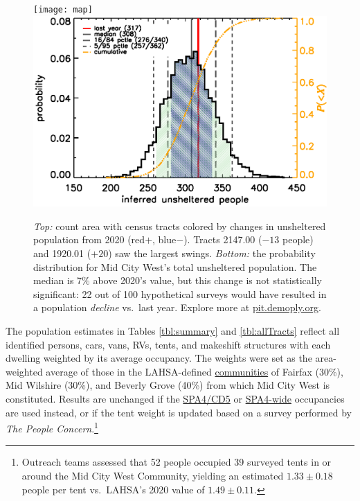 \documentclass[11pt]{article}
\begin{document}
\begin{figure}
	\centering
	\texttt{[image: map]}
	\includegraphics[width=\linewidth, trim = 0cm 0cm 0cm 0cm]{hper2021Hist}
	\caption{{\it Top:} count area with census tracts colored by  
			changes in unsheltered population from 2020 (red$+$, blue$-$).
			Tracts 2147.00 ($-13$ people) and 1920.01 ($+20$) saw the largest swings. 
			{\it Bottom:} the probability distribution for Mid City West's total unsheltered 
			population. The median is 7\% above 2020's value, but this change is not 
			statistically significant: 22 out of 100 hypothetical surveys
			would have resulted in a population {\it decline} vs.~last year.
			Explore more at \href{https://pit.demoply.org}{pit.demoply.org}.}
	\label{fig:tcomp}
\end{figure} 

 The population estimates in Tables \ref{tbl:summary} and \ref{tbl:allTracts} 
reflect all identified persons, cars, vans, RVs, tents, and makeshift structures with each
dwelling weighted by its average occupancy. The weights were set as the area-weighted 
average of those in the LAHSA-defined 
\href{https://www.lahsa.org/documents?id=4686-2020-greater-los-angeles-city-community-homelessness-report-service-planning-area-4.pdf}{communities} of Fairfax (30\%), Mid Wilshire (30\%), and 
Beverly Grove (40\%) from which Mid City West is constituted. Results are unchanged if 
the \href{https://www.lahsa.org/documents?id=4635-usc-2018-2020-multipliers-and-estimates-overview}
{SPA4/CD5} or \href{https://www.lahsa.org/documents?id=4693-2020-greater-los-angeles-homeless-count-cvrtm-conversion-factors}{SPA4-wide} occupancies are used instead, or if the tent weight is 
updated based on a survey performed by {\it The People Concern}.\footnote{Outreach teams 
assessed that 52 people occupied 39 surveyed tents in or around the Mid City West Community,
yielding an estimated $1.33\pm0.18$ people per tent vs.~LAHSA's 2020 value of $1.49\pm0.11$.}
\end{document}
